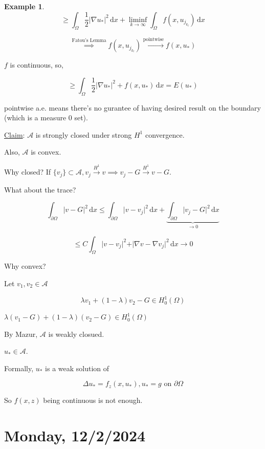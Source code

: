 \documentclass{article}
\theoremstyle{definition}
\newtheorem{example}{Example}
\begin{document}
\begin{example}
    \[
        \geq \int_{\Omega} \frac{1}{2} \vert \nabla u_{\ast} \vert^2  \,\mathrm{d}x + \liminf_{k \to \infty} \int_{\Omega} f(x,u_{j_{k_l} }) \,\mathrm{d}x 
    \]

    \[
        \overset{\text{Fatou's Lemma}}{\implies} f(x,u_{j_{k_l} }) \overset{\text{pointwise}}{\to} f(x,u_{\ast})
    \]

    \(f\) is continuous, so,

    \[
        \geq \int_{\Omega} \frac{1}{2} \vert \nabla u_{\ast} \vert ^2 + f(x,u_{\ast}) \,\mathrm{d}x = E(u_{\ast})
    \]

    pointwise a.e. means there's no gurantee of having desired result on the boundary (which is a measure \(0\) set).

    \underline{Claim}: \(\mathcal{A}\) is strongly closed under strong \(H^1\) convergence.

    Also, \(\mathcal{A}\) is convex.

    Why closed? If \(\{ v_j \} \subset \mathcal{A}, v_j \overset{H^1}{\to} v \implies v_j - G \overset{H^1}{\to} v - G\).

    What about the trace?

    \[
        \int_{\partial \Omega} \vert v - G \vert ^2 \,\mathrm{d}x \leq \int_{\partial \Omega} \vert v - v_j \vert ^2  \,\mathrm{d}x + \underbrace{\int_{\partial\Omega} \vert v_j - G \vert ^2 \,\mathrm{d}x}_{\to 0}
    \]

    \[
        \leq C \int_{\Omega} \vert v - v_j \vert ^ 2 + \vert \nabla v - \nabla v_j \vert ^2 \,\mathrm{d}x \to 0
    \]

    Why convex?

    Let \(v_1, v_2 \in \mathcal{A}\) 
    
    \[
        \lambda v_1 + (1-\lambda)v_2 - G \in H^1_0(\Omega)
    \]

    \(\lambda(v_1 - G) + (1-\lambda)(v_2 - G) \in H^1_0(\Omega)\) 

    By Mazur, \(\mathcal{A}\) is weakly closued.

    \(u_{\ast} \in \mathcal{A}\).

\end{example}

Formally, \(u_{\ast}\) is a weak solution of

\[
    \Delta u_{\ast} = f_z (x, u_{\ast}), u_{\ast} = g \text{ on } \partial \Omega
\]

So \(f(x,z)\) being continuous is not enough.

\section*{Monday, 12/2/2024}
\end{document}
